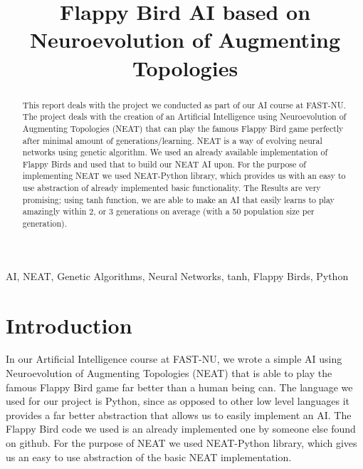 \documentclass[conference]{IEEEtran}
\begin{document}
\title{Flappy Bird AI based on Neuroevolution of Augmenting Topologies}

\author{
\and
{}
\and
{}
\and
{}
}

\maketitle

\begin{abstract}
This report deals with the project we conducted as part of our AI course at FAST-NU. The project deals with the creation of an Artificial Intelligence using Neuroevolution of Augmenting Topologies (NEAT) that can play the famous Flappy Bird game perfectly after minimal amount of generations/learning. NEAT is a way of evolving neural networks using genetic algorithm. We used an already available implementation of Flappy Birds and used that to build our NEAT AI upon. For the purpose of implementing NEAT we used NEAT-Python library, which provides us with an easy to use abstraction of already implemented basic functionality. The Results are very promising; using tanh function, we are able to make an AI that easily learns to play amazingly within 2, or 3 generations on average (with a 50 population size per generation).
\end{abstract}

\begin{IEEEkeywords}
AI, NEAT, Genetic Algorithms, Neural Networks, tanh, Flappy Birds, Python
\end{IEEEkeywords}

\section{Introduction}
In our Artificial Intelligence course at FAST-NU, we wrote a simple AI using Neuroevolution of Augmenting Topologies (NEAT) that is able to play the famous Flappy Bird game far better than a human being can. The language we used for our project is Python, since as opposed to other low level languages it provides a far better abstraction that allows us to easily implement an AI. The Flappy Bird code we used is an already implemented one by someone else found on github. For the purpose of NEAT we used NEAT-Python library, which gives us an easy to use abstraction of the basic NEAT implementation.
\end{document}
